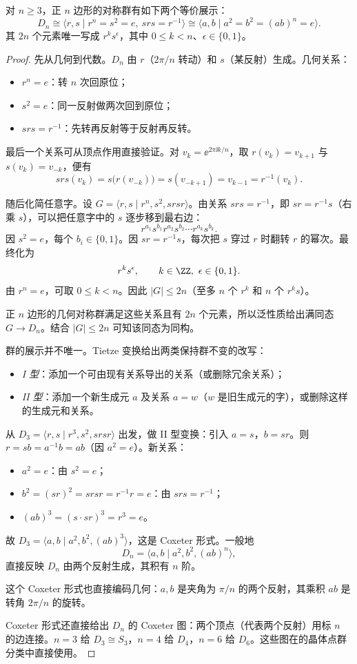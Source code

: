 \begin{proposition}
对 $n\ge3$，正 $n$ 边形的对称群有如下两个等价展示：
\[
D_n\cong\langle r,s\mid r^n=s^2=e,\ srs=r^{-1}\rangle
\cong\langle a,b\mid a^2=b^2=(ab)^n=e\rangle.
\]
其 $2n$ 个元素唯一写成 $r^ks^\epsilon$，其中 $0\le k<n$、$\epsilon\in\{0,1\}$。
\end{proposition}

\begin{proof}
先从几何到代数。$D_n$ 由 $r$（$2\pi/n$ 转动）和 $s$（某反射）生成。几何关系：
\begin{itemize}
\item $r^n=e$：转 $n$ 次回原位；
\item $s^2=e$：同一反射做两次回到原位；
\item $srs=r^{-1}$：先转再反射等于反射再反转。
\end{itemize}
最后一个关系可从顶点作用直接验证。对 $v_k=\ee^{2\pi\ii k/n}$，取
$r(v_k)=v_{k+1}$ 与 $s(v_k)=v_{-k}$，便有
\[
srs(v_k)=s\bigl(r(v_{-k})\bigr)=s(v_{-k+1})=v_{k-1}=r^{-1}(v_k).
\]

随后化简任意字。设 $G=\langle r,s\mid r^n,s^2,srsr\rangle$。由关系 $srs=r^{-1}$，即 $sr=r^{-1}s$（右乘 $s$），可以把任意字中的 $s$ 逐步移到最右边：
\[
r^{a_1}s^{b_1}r^{a_2}s^{b_2}\cdots r^{a_k}s^{b_k}.
\]
因 $s^2=e$，每个 $b_i\in\{0,1\}$。因 $sr=r^{-1}s$，每次把 $s$ 穿过 $r$ 时翻转 $r$ 的幂次。最终化为
\[
r^k s^\epsilon,\qquad k\in\ZZ,\ \epsilon\in\{0,1\}.
\]
由 $r^n=e$，可取 $0\le k<n$。因此 $|G|\le 2n$（至多 $n$ 个 $r^k$ 和 $n$ 个 $r^k s$）。

正 $n$ 边形的几何对称群满足这些关系且有 $2n$ 个元素，所以泛性质给出满同态 $G\to D_n$。结合 $|G|\le2n$ 可知该同态为同构。

群的展示并不唯一。Tietze 变换给出两类保持群不变的改写：
\begin{itemize}
\item \emph{I 型}：添加一个可由现有关系导出的关系（或删除冗余关系）；
\item \emph{II 型}：添加一个新生成元 $a$ 及关系 $a=w$（$w$ 是旧生成元的字），或删除这样的生成元和关系。
\end{itemize}

从 $D_3=\langle r,s\mid r^3,s^2,srsr\rangle$ 出发，做 II 型变换：引入 $a=s$，$b=sr$。则 $r=sb=a^{-1}b=ab$（因 $a^2=e$）。新关系：
\begin{itemize}
\item $a^2=e$：由 $s^2=e$；
\item $b^2=(sr)^2=srsr=r^{-1}r=e$：由 $srs=r^{-1}$；
\item $(ab)^3=(s\cdot sr)^3=r^3=e$。
\end{itemize}
故 $D_3=\langle a,b\mid a^2,b^2,(ab)^3\rangle$，这是 Coxeter 形式。一般地
\[
D_n=\langle a,b\mid a^2,b^2,(ab)^n\rangle,
\]
直接反映 $D_n$ 由两个反射生成，其积有 $n$ 阶。

这个 Coxeter 形式也直接编码几何：$a,b$ 是夹角为 $\pi/n$ 的两个反射，其乘积 $ab$ 是转角 $2\pi/n$ 的旋转。

Coxeter 形式还直接给出 $D_n$ 的 Coxeter 图：两个顶点（代表两个反射）用标 $n$ 的边连接。$n=3$ 给 $D_3\cong S_3$，$n=4$ 给 $D_4$，$n=6$ 给 $D_6$。这些图在的晶体点群分类中直接使用。
\end{proof}


